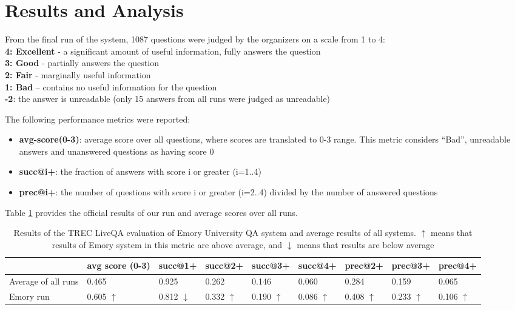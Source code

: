 \documentclass[]{article}
\begin{document}
\section{Results and Analysis}

From the final run of the system, 1087 questions were judged by the organizers on a scale from 1 to 4:\\
\textbf{4: Excellent} - a significant amount of useful information, fully answers the question\\
\textbf{3: Good} - partially answers the question\\
\textbf{2: Fair} - marginally useful information\\
\textbf{1: Bad} – contains no useful information for the question\\
\textbf{-2}: the answer is unreadable  (only 15 answers from all runs were judged as unreadable)

The following performance metrics were reported:
\begin{itemize}
\setlength\itemsep{0mm}
\item \textbf{avg-score(0-3)}: average score over all questions, where scores are translated to 0-3 range. This metric considers ``Bad'', unreadable answers and unanswered questions as having score 0
\item \textbf{succ@i+}: the fraction of answers with score i or greater (i=1..4)
\item \textbf{prec@i+}: the number of questions with score i or greater (i=2..4) divided by the number of answered questions
\end{itemize}
Table \ref{table:liveqa-results} provides the official results of our run and average scores over all runs.

\begin{table}
\caption{Results of the TREC LiveQA evaluation of Emory University QA system and average results of all systems. $\uparrow$ means that results of Emory system in this metric are above average, and $\downarrow$ means that results are below average}
\label{table:liveqa-results}
\begin{tabular}{|p{2cm}|p{1.4cm}|p{1.3cm}|p{1.3cm}|p{1.3cm}|p{1.3cm}|p{1.3cm}|p{1.3cm}|p{1.3cm}|}
\hline
 & avg score (0-3) & succ@1+ & succ@2+ & succ@3+ & succ@4+ & prec@2+ &
 prec@3+ & prec@4+ \\
\hline
Average of all runs & 0.465 & 0.925 & 0.262 & 0.146 & 0.060 & 0.284 & 0.159 & 0.065\\
 \hline
Emory run & 0.605 $\uparrow$ & 0.812 $\downarrow$ & 0.332 $\uparrow$ & 0.190 $\uparrow$ & 0.086 $\uparrow$ & 0.408 $\uparrow$ & 0.233 $\uparrow$ & 0.106 $\uparrow$\\
\hline
\end{tabular}
\end{table}
\end{document}
